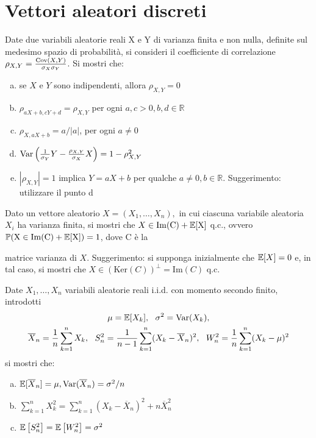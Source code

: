 
\chapter{Vettori aleatori discreti}

\ParteEsercizi

\Esercizio{}

Date due variabili aleatorie reali X e Y di varianza finita e non nulla, definite sul medesimo spazio di probabilità, si consideri il coefficiente di correlazione $\rho _{X,Y} =\frac{\operatorname{Cov} (X,Y)}{\sigma _{X} \sigma _{Y}}$. Si mostri che:
\begin{enumerate}[a)]
	\item se $X$ e $Y$ sono indipendenti, allora $\rho _{X,Y} =0$
	\item $\rho _{aX+b,cY+d} =\rho _{X,Y}$ per ogni $a,c >0,b,d\in \mathbb{R}$
	\item $\rho _{X,aX+b} =a/|a|$, per ogni $a\neq 0$
	\item $\operatorname{Var}\left(\frac{1}{\sigma _{Y}} Y-\frac{\rho _{X,Y}}{\sigma _{X}} X\right)=1-\rho _{X,Y}^{2}$
	\item $| \rho _{X,Y}| =1$ implica $Y=aX+b$ per qualche $a\neq 0,b\in \mathbb{R}$. Suggerimento: utilizzare il punto d
\end{enumerate}

\Esercizio{$\star$}

Dato un vettore aleatorio $X=(X_{1} ,\dots ,X_{n}) ,$ in cui ciascuna variabile aleatoria $X_{i}$ ha varianza finita, si mostri che $X\in \mathrm{Im} (\mathrm{C})+\mathbb{E}[\mathrm{X}]$ q.c., ovvero $\mathbb{P} (\mathrm{X} \in \mathrm{Im} (\mathrm{C})+\mathbb{E}[\mathrm{X}])=1$, dove $\mathrm{C}$ è la

matrice varianza di $X$. Suggerimento: si supponga inizialmente che $\mathbb{E}[X]=0$ e, in tal caso, si mostri che $X\in (\mathrm{Ker} (C))^{\perp } =\mathrm{Im} (C)$ q.c.

\Esercizio{}\label{sec:ese3}

Date $X_{1} ,\dots ,X_{n}$ variabili aleatorie reali i.i.d. con momento secondo finito, introdotti
\begin{gather*}
\mu =\EE[ X_{k}] ,\ \ \sigma ^{2} =\Var(X_{k}) ,\\
\overline{X}_{n} =\frac{1}{n}\sum _{k=1}^{n} X_{k} ,\ \ S_{n}^{2} =\frac{1}{n-1}\sum _{k=1}^{n}(X_{k} -\overline{X}_{n})^{2} ,\ \ W_{n}^{2} =\frac{1}{n}\sum _{k=1}^{n}(X_{k} -\mu)^{2}
\end{gather*}
si mostri che:
\begin{enumerate}[a)]
	\item $\mathbb{E}[\overline{X}_{n}] =\mu ,\operatorname{Var}(\overline{X}_{n}) =\sigma ^{2} /n$
	\item\label{esercizio3b} $\sum _{k=1}^{n} X_{k}^{2} =\sum _{k=1}^{n}(X_{k} -\overline{X}_{n})^{2} +n\overline{X}_{n}^{2}$
	\item $\mathbb{E}\left[ S_{n}^{2}\right] =\mathbb{E}\left[ W_{n}^{2}\right] =\sigma ^{2}$
\end{enumerate}

